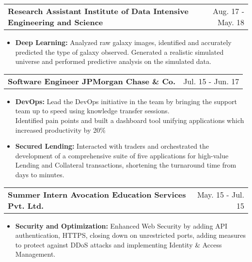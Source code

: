 \documentclass[a4paper,10pt]{article}
\makeatletter
\newcommand{\projectHeading}[2]{
    \begin{tabular*}{1\textwidth}{l@{\extracolsep{\fill}}r}
      \large{\textbf{#1}} & \small{#2} 
    \end{tabular*}
}
\newcommand{\resumeItemListStart}{\begin{itemize}[topsep=3pt, parsep=1pt, listparindent=0pt, itemindent=0pt, itemsep=0.5pt, leftmargin=*]}
\newcommand{\resumeItemListEnd}{\end{itemize}}
\makeatother
\begin{document}
  \projectHeading
	  {Research Assistant \textbar{} Institute of Data Intensive Engineering and Science %
	}{Aug. 17 - May. 18}
  	\resumeItemListStart
  		\item\small{\textbf{Deep Learning: }
  			{Analyzed raw galaxy images, identified and accurately predicted the type of galaxy observed. Generated a realistic simulated universe and performed predictive analysis on the simulated data.}}
  \resumeItemListEnd
  
  
    \projectHeading
      {Software Engineer \textbar{} JPMorgan Chase \& Co.}
     {Jul. 15 - Jun. 17}
      \resumeItemListStart
        \item\small{\textbf{DevOps: }
        {Lead the DevOps initiative in the team by bringing the support team up to speed using knowledge transfer sessions. \\
        Identified pain points and built a dashboard tool unifying applications which increased productivity by 20\%}} \vspace{2pt}
        \item\small{\textbf{Secured Lending: }
          {Interacted with traders and orchestrated the development of a comprehensive suite of five applications for high-value Lending and Collateral transactions, shortening the turnaround time from days to minutes.}}
      \resumeItemListEnd
      
   
    \projectHeading{Summer Intern \textbar{} Avocation Education Services Pvt. Ltd.}
   {May. 15 - Jul. 15}
   \resumeItemListStart
   		\item\small{\textbf{Security and Optimization: }
   		{Enhanced Web Security by adding API authentication, HTTPS, closing down on unrestricted ports, adding measures to protect against DDoS attacks and implementing Identity \& Access Management.}}
   \resumeItemListEnd
%   

      
\end{document}
